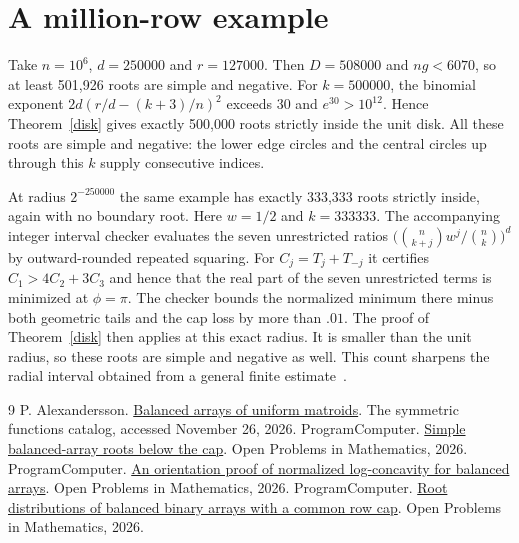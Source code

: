 \documentclass[11pt]{article}
\begin{document}
\section{A million-row example}
Take $n=10^6$, $d=250000$ and $r=127000$. Then $D=508000$ and $ng<6070$, so at least 501,926 roots are simple and negative. For $k=500000$, the binomial exponent $2d(r/d-(k+3)/n)^2$ exceeds $30$ and $e^{30}>10^{12}$. Hence Theorem~\ref{disk} gives exactly 500,000 roots strictly inside the unit disk. All these roots are simple and negative: the lower edge circles and the central circles up through this $k$ supply consecutive indices.

At radius $2^{-250000}$ the same example has exactly 333,333 roots strictly inside, again with no boundary root. Here $w=1/2$ and $k=333333$. The accompanying integer interval checker evaluates the seven unrestricted ratios $\bigl(\binom n{k+j}w^j/\binom nk\bigr)^d$ by outward-rounded repeated squaring. For $C_j=T_j+T_{-j}$ it certifies $C_1>4C_2+3C_3$ and hence that the real part of the seven unrestricted terms is minimized at $\phi=\pi$. The checker bounds the normalized minimum there minus both geometric tails and the cap loss by more than $.01$. The proof of Theorem~\ref{disk} then applies at this exact radius. It is smaller than the unit radius, so these roots are simple and negative as well. This count sharpens the radial interval obtained from a general finite estimate~\cite{distributions}.

\begin{thebibliography}{9}
 P. Alexandersson. \href{https://www.symmetricfunctions.com/realRootedOpenProblems.htm\#conjBalancedArrays}{Balanced arrays of uniform matroids}. The symmetric functions catalog, accessed November 26, 2026.
 ProgramComputer. \href{https://github.com/ProgramComputer/open-math-research/tree/2cadc6002bda2bec41c982f5899cad820033074e/topics/balanced-arrays/dense-regime/below-cap}{Simple balanced-array roots below the cap}. Open Problems in Mathematics, 2026.
 ProgramComputer. \href{https://github.com/ProgramComputer/open-math-research/blob/2cadc6002bda2bec41c982f5899cad820033074e/topics/balanced-arrays/orientation-normalization.md}{An orientation proof of normalized log-concavity for balanced arrays}. Open Problems in Mathematics, 2026.
 ProgramComputer. \href{https://github.com/ProgramComputer/open-math-research/tree/f379722253bc3668d004a77df70fdf631de21273/topics/balanced-arrays/root-distributions}{Root distributions of balanced binary arrays with a common row cap}. Open Problems in Mathematics, 2026.
\end{thebibliography}
\end{document}
